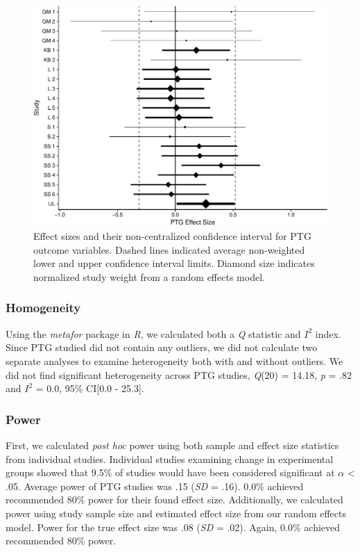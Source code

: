 \documentclass[english,man, mask]{apa6}
\theoremstyle{definition}
\theoremstyle{definition}
\theoremstyle{definition}
\theoremstyle{remark}
\begin{document}
\begin{figure}[htbp]
\centering
\includegraphics{meta_markdown_files/figure-latex/ptgpic-1.pdf}
\caption{\label{fig:ptgpic}Effect sizes and their non-centralized confidence
interval for PTG outcome variables. Dashed lines indicated average
non-weighted lower and upper confidence interval limits. Diamond size
indicates normalized study weight from a random effects model.}
\end{figure}

\subsubsection{Homogeneity}\label{homogeneity-1}

Using the \emph{metafor} package in \emph{R}, we calculated both a
\emph{Q} statistic and \(I^2\) index. Since PTG studied did not contain
any outliers, we did not calculate two separate analyses to examine
heterogeneity both with and without outliers. We did not find
significant heterogeneity across PTG studies, \emph{Q}(20) = 14.18,
\emph{p} = .82 and \(I^2\) = 0.0, 95\% CI{[}0.0 - 25.3{]}.

\subsubsection{Power}\label{power-1}

First, we calculated \emph{post hoc} power using both sample and effect
size statistics from individual studies. Individual studies examining
change in experimental groups showed that 9.5\% of studies would have
been considered significant at \(\alpha\) \textless{} .05. Average power
of PTG studies was .15 (\emph{SD} = .16). 0.0\% achieved recommended
80\% power for their found effect size. Additionally, we calculated
power using study sample size and estimated effect size from our random
effects model. Power for the true effect size was .08 (\emph{SD} = .02).
Again, 0.0\% achieved recommended 80\% power.
\end{document}
